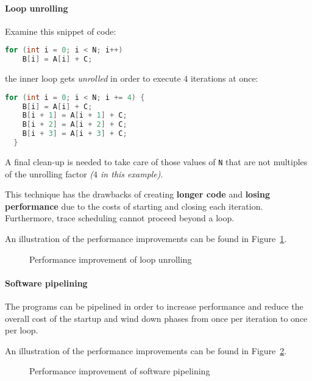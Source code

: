 \documentclass[english]{article}
\begin{document}
\paragraph{Loop unrolling}
\label{par:loop-unrolling}

Examine this snippet of code:

\begin{lstlisting}[language=C]
  for (int i = 0; i < N; i++)
    B[i] = A[i] + C;
\end{lstlisting}

the inner loop gets \textit{unrolled} in order to execute \(4\) iterations at once:

\begin{lstlisting}[language=C]
  for (int i = 0; i < N; i += 4) {
    B[i] = A[i] + C;
    B[i + 1] = A[i + 1] + C;
    B[i + 2] = A[i + 2] + C;
    B[i + 3] = A[i + 3] + C;
  }
\end{lstlisting}

A final clean-up is needed to take care of those values of \texttt{N} that are not multiples of the unrolling factor \textit{(\(4\) in this example)}.

This technique has the drawbacks of creating \textbf{longer code} and \textbf{losing performance} due to the costs of starting and closing each iteration.
Furthermore, trace scheduling cannot proceed beyond a loop.

\bigskip
An illustration of the performance improvements can be found in Figure~\ref{fig:performance-improvement-loop-unrolling}.

\begin{figure}[htbp]
  \bigskip
  \centering
  \caption{Performance improvement of loop unrolling}
  \label{fig:performance-improvement-loop-unrolling}
  \bigskip
\end{figure}

\paragraph{Software pipelining}
\label{par:software-pipelining}

The programs can be pipelined in order to increase performance and reduce the overall cost of the startup and wind down phases from once per iteration to once per loop.

\bigskip
An illustration of the performance improvements can be found in Figure~\ref{fig:performance-improvement-software-pipelining}.

\begin{figure}[htbp]
  \bigskip
  \centering
  \caption{Performance improvement of software pipelining}
  \label{fig:performance-improvement-software-pipelining}
  \bigskip
\end{figure}
\end{document}
